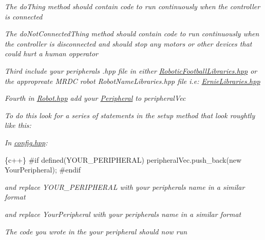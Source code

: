 {\itshape The do\+Thing method should contain code to run continuously when the controller is connected}

{\itshape The do\+Not\+Connected\+Thing method should contain code to run continuously when the controller is disconnected and should stop any motors or other devices that could hurt a human opperator}

{\itshape Third include your peripherals .hpp file in either \mbox{\hyperlink{_robotic_football_libraries_8hpp_source}{Robotic\+Football\+Libraries.\+hpp}} or the appropreate M\+R\+DC robot Robot\+Name\+Libraries.\+hpp file i.\+e\+: \mbox{\hyperlink{_ernie_libraries_8hpp_source}{Ernie\+Libraries.\+hpp}}}

{\itshape Fourth in \mbox{\hyperlink{_robot_8hpp_source}{Robot.\+hpp}} add your \mbox{\hyperlink{class_peripheral}{Peripheral}} to peripheral\+Vec}

{\itshape To do this look for a series of statements in the setup method that look roughtly like this\+:}

{\itshape In \mbox{\hyperlink{_config_8hpp_source}{config.\+hpp}}\+: 
\begin{DoxyCode}
\{c++\}
#if defined(YOUR\_PERIPHERAL) 
  peripheralVec.push\_back(new YourPeripheral);
#endif
\end{DoxyCode}
}

{\itshape and replace Y\+O\+U\+R\+\_\+\+P\+E\+R\+I\+P\+H\+E\+R\+AL with your peripherals name in a similar format}

{\itshape and replace Your\+Peripheral with your peripherals name in a similar format}

{\itshape The code you wrote in the your peripheral should now run }